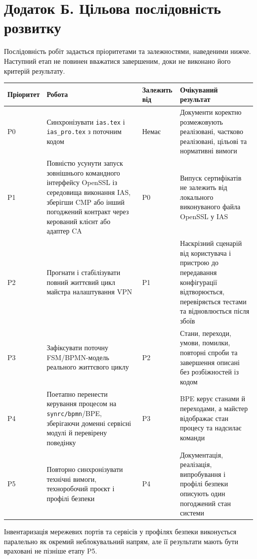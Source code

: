\documentclass{article}
\begin{document}
\section{Додаток Б. Цільова послідовність розвитку}
Послідовність робіт задається пріоритетами та залежностями, наведеними нижче. Наступний етап не повинен вважатися завершеним, доки не виконано його критерій результату.

\begin{longtable}{p{1.3cm}p{4.4cm}p{3.2cm}p{5.2cm}}
\toprule
\textbf{Пріоритет} & \textbf{Робота} & \textbf{Залежить від} & \textbf{Очікуваний результат} \\
\midrule
P0 & Синхронізувати \texttt{ias.tex} і \texttt{ias\_pro.tex} з поточним кодом & Немає & Документи коректно розмежовують реалізовані, частково реалізовані, цільові та нормативні вимоги \\
P1 & Повністю усунути запуск зовнішнього командного інтерфейсу OpenSSL із середовища виконання IAS, зберігши CMP або інший погоджений контракт через керований клієнт або адаптер CA & P0 & Випуск сертифікатів не залежить від локального виконуваного файла OpenSSL у IAS \\
P2 & Прогнати і стабілізувати повний життєвий цикл майстра налаштування VPN & P1 & Наскрізний сценарій від користувача і пристрою до передавання конфігурації відтворюється, перевіряється тестами та відновлюється після збоїв \\
P3 & Зафіксувати поточну FSM/BPMN-модель реального життєвого циклу & P2 & Стани, переходи, умови, помилки, повторні спроби та завершення описані без розбіжностей із кодом \\
P4 & Поетапно перенести керування процесом на \texttt{synrc/bpmn}/BPE, зберігаючи доменні сервісні модулі й перевірену поведінку & P3 & BPE керує станами й переходами, а майстер відображає стан процесу та надсилає команди \\
P5 & Повторно синхронізувати технічні вимоги, техноробочий проєкт і профілі безпеки & P4 & Документація, реалізація, випробування і профілі безпеки описують один погоджений стан системи \\
\bottomrule
\end{longtable}

Інвентаризація мережевих портів та сервісів у профілях безпеки виконується паралельно як окремий неблокувальний напрям, але її результати мають бути враховані не пізніше етапу P5.
\end{document}
